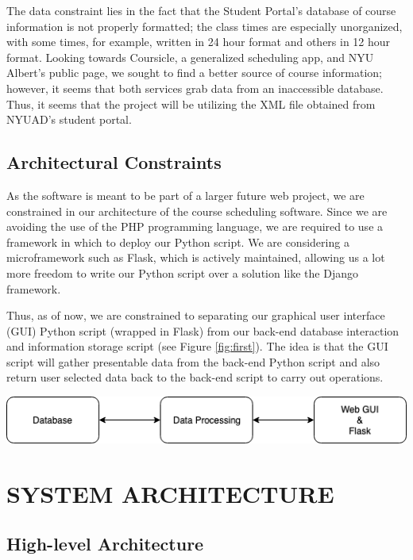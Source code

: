\documentclass[a4paper, 11.5 pt, conference]{ieeeconf}  %
\begin{document}
\noindent The data constraint lies in the fact that the Student Portal's database of course information is not properly formatted; the class times are especially unorganized, with some times, for example, written in 24 hour format and others in 12 hour format. Looking towards Coursicle, a generalized scheduling app, and NYU Albert's public page, we sought to find a better source of course information; however, it seems that both services grab data from an inaccessible database. Thus, it seems that the project will be utilizing the XML file obtained from NYUAD's student portal.

\subsection{Architectural Constraints}
 \noindent As the software is meant to be part of a larger future web project, we are constrained in our architecture of the course scheduling software. Since we are avoiding the use of the PHP programming language, we are required to use a framework in which to deploy our Python script. We are considering a microframework such as Flask, which is actively maintained, allowing us a lot more freedom to write our Python script over a solution like the Django framework. 
 
 Thus, as of now, we are constrained to separating our graphical user interface (GUI) Python script (wrapped in Flask) from our back-end database interaction and information storage script (see Figure \ref{fig:first}). The idea is that the GUI script will gather presentable data from the back-end Python script and also return user selected data back to the back-end script to carry out operations.
 
\begingroup
    \medskip
    \centering
    \includegraphics[width=\columnwidth]{images/high-level.png}
    \label{fig:second}
    \medskip
\endgroup

\section{SYSTEM ARCHITECTURE}
\subsection{High-level Architecture}
\end{document}
